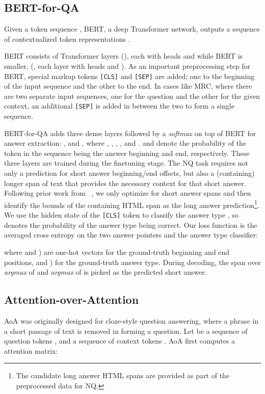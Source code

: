 \documentclass[letterpaper]{article} \usepackage{aaai20}  \usepackage{times}  \usepackage{helvet} \usepackage{courier}  \usepackage[hyphens]{url}  \usepackage{graphicx} \urlstyle{rm} \def\UrlFont{\rm}  \usepackage{graphicx}  \frenchspacing  \setlength{\pdfpagewidth}{8.5in}  \setlength{\pdfpageheight}{11in}  \usepackage{amsmath}
\newcommand{\bertbase}{BERT}
\newcommand{\bertlarge}{BERT}
\newcommand{\citet}[1]{\citeauthor{#1}~\shortcite{#1}}
\begin{document}
\subsection{BERT-for-QA} 
Given a token sequence , BERT, a deep Transformer \cite{Vaswani_2017} network, outputs a sequence of contextualized token representations .

\bertlarge{} consists of  Transformer layers (), each with  heads and  while \bertbase{} is smaller, (, each layer with  heads and ). 
As an important preprocessing step for BERT, special markup tokens  {\tt[CLS]} and {\tt[SEP]} are added; one to the beginning of the input sequence and the other to the end. In cases like MRC, where there are two separate input sequences, one for the question and the other for the given context, an additional {\tt[SEP]} is added in between the two to form a single sequence.

{\sc BERT-for-QA} adds three dense layers followed by a \emph{softmax} on top of BERT for answer extraction: ,  and , where , , , , and .  and  denote the probability of the  token in the sequence being the answer beginning and end, respectively. These three layers are trained during the finetuning stage. The NQ task requires not only a prediction for short answer beginning/end offsets, but also a (containing) longer span of text that provides the necessary context for that short answer. Following prior work from \citet{alberti2019bert}, we only optimize for short answer spans and then identify the bounds of the containing HTML span as the long answer prediction\footnote{The candidate long answer HTML spans are provided as part of the preprocessed data for NQ.}. We use the hidden state of the {\tt[CLS]} token to classify the answer type , so  denotes the probability of the  answer type being correct. Our loss function is the averaged cross entropy on the two answer pointers and the answer type classifier:







where  and ) are one-hot vectors for the ground-truth beginning and end positions, and ) for the ground-truth answer type.
During decoding, the span over \emph{argmax} of  and \emph{argmax} of  is picked as the predicted short answer. 



\subsection{Attention-over-Attention}
AoA was originally designed for cloze-style question answering, where a phrase in a short passage of text is removed in forming a question. Let  be a sequence of question tokens , and  a sequence of context tokens . AoA first computes a attention matrix:
\end{document}
